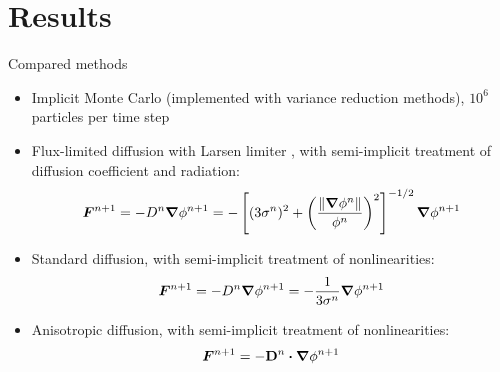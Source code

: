 \documentclass{beamer}
\newcommand{\Dtens}{\mat{D}}
\begin{document}
\section{Results}
\begin{frame}{Compared methods}
\begin{itemize}
  \item Implicit Monte Carlo \cite{Fle1971} (implemented with variance
    reduction methods), $10^6$ particles per time step
  \item Flux-limited diffusion with Larsen limiter \cite{Ols2000}, with
    semi-implicit treatment of diffusion coefficient and radiation:
    \begin{equation*}
      \bm{F}^{n+1} = - D^{n} \bm{\nabla} \phi^{n+1}  = -\left[ (3\sigma^{n})^2
      + \left( \frac{\left\| \bm{\nabla} \phi^{n} \right\|}{\phi^{n}}  \right)^2 \right]^{-1/2}
      \bm{\nabla} \phi^{n+1}
    \end{equation*}
  \item Standard diffusion, with semi-implicit treatment of nonlinearities:
    \begin{equation*}
      \bm{F}^{n+1} = - D^{n} \bm{\nabla} \phi^{n+1} 
      = -\frac{1}{3\sigma^{n}} \bm{\nabla} \phi^{n+1}
    \end{equation*}
  \item Anisotropic diffusion, with semi-implicit treatment of nonlinearities:
    \begin{equation*}
      \vec{F}^{n+1} = -\Dtens^{n}\vd \del \phi^{n+1} 
    \end{equation*}
\end{itemize}
\end{frame}
\end{document}
